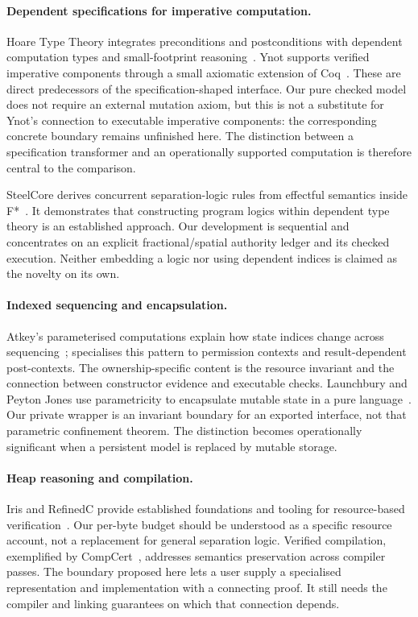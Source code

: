 \documentclass[a4paper,UKenglish,cleveref]{lipics-v2021}
\begin{document}
\paragraph*{Dependent specifications for imperative computation.}
Hoare Type Theory integrates preconditions and postconditions with dependent
computation types and small-footprint reasoning~\cite{htt}. Ynot supports
verified imperative components through a small axiomatic extension of
Coq~\cite{ynot}. These are direct predecessors of the specification-shaped
 interface. Our pure checked model does not require an external
mutation axiom, but this is not a substitute for Ynot's connection to executable
imperative components: the corresponding concrete boundary remains unfinished
here. The distinction between a specification transformer and an operationally
supported computation is therefore central to the comparison.

SteelCore derives concurrent separation-logic rules from effectful semantics
inside F*~\cite{steelcore}. It demonstrates that constructing program logics
within dependent type theory is an established approach. Our development is
sequential and concentrates on an explicit fractional/spatial authority ledger
and its checked execution. Neither embedding a logic nor using dependent
indices is claimed as the novelty on its own.

\paragraph*{Indexed sequencing and encapsulation.}
Atkey's parameterised computations explain how state indices change across
sequencing~\cite{atkey};  specialises this pattern to permission
contexts and result-dependent post-contexts. The ownership-specific content is
the resource invariant and the connection between constructor evidence and
executable checks. Launchbury and Peyton Jones use parametricity to encapsulate
mutable state in a pure language~\cite{st}. Our private wrapper is an invariant
boundary for an exported interface, not that parametric confinement theorem.
The distinction becomes operationally significant when a persistent model is
replaced by mutable storage.

\paragraph*{Heap reasoning and compilation.}
Iris and RefinedC provide established foundations and tooling for resource-based
verification~\cite{iris,refinedc}. Our per-byte budget should be understood as a
specific resource account, not a replacement for general separation logic.
Verified compilation, exemplified by CompCert~\cite{compcert}, addresses
semantics preservation across compiler passes. The boundary proposed here lets
a user supply a specialised representation and implementation with a connecting
proof. It still needs the compiler and linking guarantees on which that
connection depends.
\end{document}
